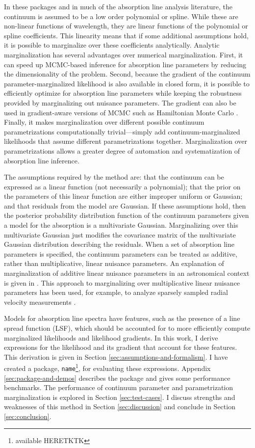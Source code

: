 \documentclass[manuscript]{aastex62}
\newcommand{\pkgname}{\texttt{name}}
\begin{document}
In these packages and in much of the absorption line analysis literature, the continuum is assumed to be a low order polynomial or spline.
While these are non-linear functions of wavelength, they are linear functions of the polynomial or spline coefficients.
This linearity means that if some additional assumptions hold, it is possible to marginalize over these coefficients analytically.
Analytic marginalization has several advantages over numerical marginalization.
First, it can speed up MCMC-based inference for absorption line parameters by reducing the dimensionality of the problem.
Second, because the gradient of the continuum parameter-marginalized likelihood is also available in closed form, it is possible to efficiently optimize for absorption line parameters while keeping the robustness provided by marginalizing out nuisance parameters.
The gradient can also be used in gradient-aware versions of MCMC such as Hamiltonian Monte Carlo \citep{DUANE1987216}.
Finally, it makes marginalization over different possible continuum parametrizations computationally trivial---simply add continuum-marginalized likelihoods that assume different parametrizations together.
Marginalization over parametrizations allows a greater degree of automation and systematization of absorption line inference.

The assumptions required by the method are: that the continuum can be expressed as a linear function (not necessarily a polynomial); that the prior on the parameters of this linear function are either improper uniform or Gaussian; and that residuals from the model are Gaussian.
If these assumptions hold, then the posterior probability distribution function of the continuum parameters given a model for the absorption is a multivariate Gaussian.
Marginalizing over this multivariate Gaussian just modifies the covariance matrix of the multivariate Gaussian distribution describing the residuals.
When a set of absorption line parameters is specified, the continuum parameters can be treated as additive, rather than multiplicative, linear nuisance parameters.
An explanation of marginalization of additive linear nuisance parameters in an astronomical context is given in \citet{2017RNAAS...1a...7L}.
This approach to marginalizing over multiplicative linear nuisance parameters has been used, for example, to analyze sparsely sampled radial velocity measurements \citep{2017ApJ...837...20P}.

Models for absorption line spectra have features, such as the presence of a line spread function (LSF), which should be accounted for to more efficiently compute marginalized likelihoods and likelihood gradients.
In this work, I derive expressions for the likelihood and its gradient that account for these features.
This derivation is given in Section \ref{sec:assumptions-and-formalism}.
I have created a package, \pkgname\footnote{available HERETKTK}, for evaluating these expressions.
Appendix \ref{sec:package-and-demos} describes the package and gives some performance benchmarks.
The performance of continuum parameter and parametrization marginalization is explored in Section \ref{sec:test-cases}.
I discuss strengths and weaknesses of this method in Section \ref{sec:discussion} and conclude in Section \ref{sec:conclusion}.
\end{document}
